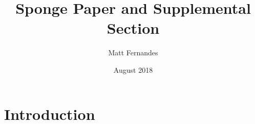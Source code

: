 \documentclass{article}
\title{Sponge Paper and Supplemental Section}
\author{Matt Fernandes}
\date{August 2018}
\begin{document}
\maketitle

\section{Introduction}
\end{document}
